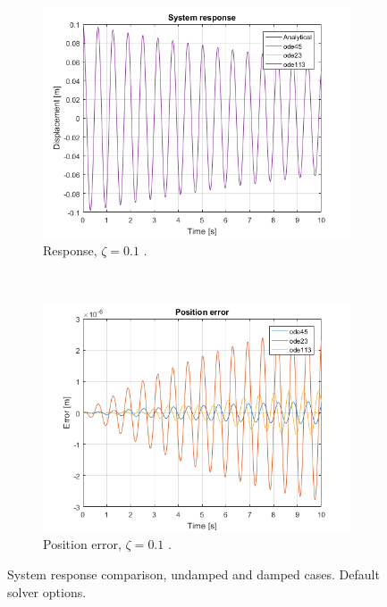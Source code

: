 \documentclass{article}
\begin{document}
\begin{figure}[h]
		\begin{subfigure}[t]{0.41\textwidth}
			\includegraphics[width=\textwidth]{response_comparison_damped.png}
			\caption{Response, $\zeta = 0.1$ .}
		\end{subfigure}
		~
		\begin{subfigure}[t]{0.41\textwidth}
			\includegraphics[width=\textwidth]{error_comparison_damped.png}
			\caption{Position error, $\zeta = 0.1$ .}
		\end{subfigure}
		\caption{System response comparison, undamped and damped cases. Default solver options.}
		\label{fig:response}
	\end{figure}
	
\end{document}
